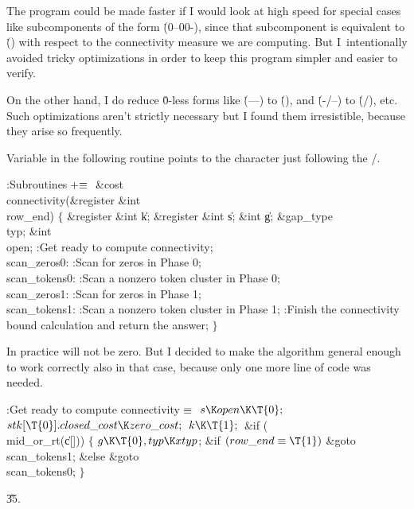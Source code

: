 The program could be made faster if I would look at high speed for
special cases like subcomponents of the form \.{(0--00-)}, since
that subcomponent is equivalent to \.{()} with respect to the
connectivity measure we are computing. But I~intentionally avoided tricky
optimizations in order to keep this program simpler and easier to verify.

On the other hand, I do
reduce \.0-less forms like \.{(---)} to \.{()},
and \.{(-\caret/--)} to \.{(\caret/)}, etc.
Such optimizations aren't strictly necessary but I found them irresistible,
because they arise so frequently.

Variable  in the following routine points to the character
just
following the \qcaret/.

\Y\B\4:Subroutines\X${}\mathrel+\equiv{}$\6
\&{cost} \\{connectivity}(\&{register} \&{int} \\{row\_end})\1\1\2\2\6
${}\{{}$\1\6
\&{register} \&{int} \|k;\6
\&{register} \&{int} \|s;\6
\&{int} \|g;\6
\&{gap\_type} \\{typ};\6
\&{int} \\{open};\7
:Get ready to compute connectivity\X;\6
\4\\{scan\_zeros0}:\5
:Scan for zeros in Phase 0\X;\6
\4\\{scan\_tokens0}:\5
:Scan a nonzero token cluster in Phase 0\X;\6
\4\\{scan\_zeros1}:\5
:Scan for zeros in Phase 1\X;\6
\4\\{scan\_tokens1}:\5
:Scan a nonzero token cluster in Phase 1\X;\6
:Finish the connectivity bound calculation and return the answer\X;\6
\4${}\}{}$\2\par
\fi

In practice  will not be zero. But I decided to make the
algorithm
general enough to work correctly also in that case, because only one more
line of code was needed.

\Y\B\4:Get ready to compute connectivity\X${}\equiv{}$\6
$\|s\K\\{open}\K\T{0};{}$\6
${}\\{stk}[\T{0}].\\{closed\_cost}\K\\{zero\_cost};{}$\6
${}\|k\K\T{1};{}$\6
\&{if} (\\{mid\_or\_rt}(\|c[]))\5
${}\{{}$\1\6
${}\|g\K\T{0},\39\\{typ}\K\\{xtyp}{}$;\6
\&{if} ${}(\\{row\_end}\E\T{1}){}$\1\5
\&{goto} \\{scan\_tokens1};\2\6
\&{else}\1\5
\&{goto} \\{scan\_tokens0};\2\6
\4${}\}{}$\2\par
\U35.\fi

